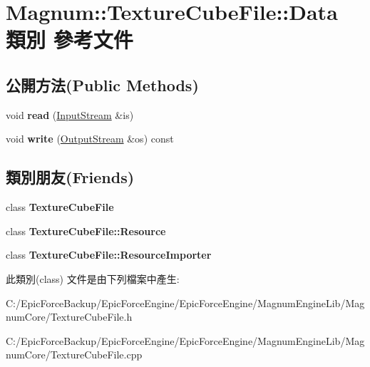 \hypertarget{class_magnum_1_1_texture_cube_file_1_1_data}{}\section{Magnum\+:\+:Texture\+Cube\+File\+:\+:Data 類別 參考文件}
\label{class_magnum_1_1_texture_cube_file_1_1_data}
\subsection*{公開方法(Public Methods)}
\begin{DoxyCompactItemize}
\item 
void {\bfseries read} (\hyperlink{class_magnum_1_1_input_stream}{Input\+Stream} \&is)\hypertarget{class_magnum_1_1_texture_cube_file_1_1_data_ad76942f856810a5fdd06555fc428098f}{}\label{class_magnum_1_1_texture_cube_file_1_1_data_ad76942f856810a5fdd06555fc428098f}

\item 
void {\bfseries write} (\hyperlink{class_magnum_1_1_output_stream}{Output\+Stream} \&os) const \hypertarget{class_magnum_1_1_texture_cube_file_1_1_data_a4e696b1bf0e133f18dd9cd8ecc881aab}{}\label{class_magnum_1_1_texture_cube_file_1_1_data_a4e696b1bf0e133f18dd9cd8ecc881aab}

\end{DoxyCompactItemize}
\subsection*{類別朋友(Friends)}
\begin{DoxyCompactItemize}
\item 
class {\bfseries Texture\+Cube\+File}\hypertarget{class_magnum_1_1_texture_cube_file_1_1_data_a5a4cc7500bfedf34cfa4a8a270cc6c13}{}\label{class_magnum_1_1_texture_cube_file_1_1_data_a5a4cc7500bfedf34cfa4a8a270cc6c13}

\item 
class {\bfseries Texture\+Cube\+File\+::\+Resource}\hypertarget{class_magnum_1_1_texture_cube_file_1_1_data_a6dd29e2fc99c16ad18aa9e40e44dcc05}{}\label{class_magnum_1_1_texture_cube_file_1_1_data_a6dd29e2fc99c16ad18aa9e40e44dcc05}

\item 
class {\bfseries Texture\+Cube\+File\+::\+Resource\+Importer}\hypertarget{class_magnum_1_1_texture_cube_file_1_1_data_abd0103c9043c92f29b4a7e3fe219a646}{}\label{class_magnum_1_1_texture_cube_file_1_1_data_abd0103c9043c92f29b4a7e3fe219a646}

\end{DoxyCompactItemize}


此類別(class) 文件是由下列檔案中產生\+:\begin{DoxyCompactItemize}
\item 
C\+:/\+Epic\+Force\+Backup/\+Epic\+Force\+Engine/\+Epic\+Force\+Engine/\+Magnum\+Engine\+Lib/\+Magnum\+Core/Texture\+Cube\+File.\+h\item 
C\+:/\+Epic\+Force\+Backup/\+Epic\+Force\+Engine/\+Epic\+Force\+Engine/\+Magnum\+Engine\+Lib/\+Magnum\+Core/Texture\+Cube\+File.\+cpp\end{DoxyCompactItemize}
